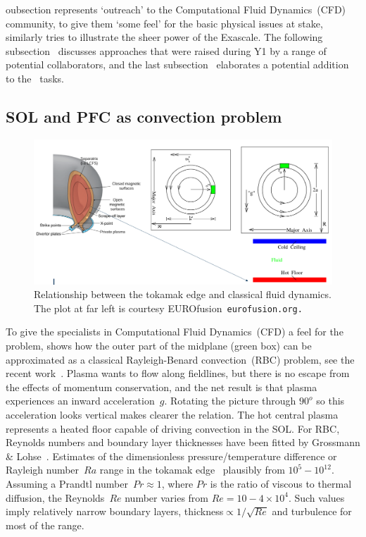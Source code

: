 oubsection  represents `outreach' to the  Computational Fluid Dynamics~(CFD) community,
to give them `some feel' for the basic physical issues at stake, similarly   tries
to illustrate the sheer power of the Exascale.  The following subsection~ discusses approaches that
were raised during Y1 by a range of potential collaborators, and the last subsection~ elaborates
a potential addition to the \nep \ tasks.

\subsection{SOL and PFC as convection problem}\label{sec:rbc}
\begin{figure}
\centerline{\includegraphics[width=13cm]{../png/rbc}}
\caption{Relationship between the tokamak edge and classical fluid dynamics\label{fig:rbc}.
The plot at far left is courtesy EUROfusion~\tt{eurofusion.org}.}
\end{figure}
To give the specialists in  Computational Fluid Dynamics~(CFD)
a feel for the problem,  shows how the outer part of
the midplane (green box) can be approximated as a classical Rayleigh-Benard convection~(RBC) problem,
see the recent work~\cite{Wi19Stab}.
Plasma wants to flow along fieldlines, but there is no escape from the effects of
momentum conservation, and the net result is that plasma experiences an inward
acceleration~$g$. Rotating the picture through $90^o$ so this acceleration looks vertical
makes clearer the relation. The hot central plasma represents a heated floor capable of
driving convection in the SOL.
For RBC, Reynolds numbers and boundary layer thicknesses have been fitted
by Grossmann \& Lohse~\cite{Gr00Scal}. Estimates of the dimensionless
pressure/temperature difference or Rayleigh number~$Ra$ range in the tokamak edge~\cite{Wi19Stab}
plausibly from $10^5-10^{12}$. Assuming a Prandtl number~$Pr\approx 1$,
where $Pr$ is the ratio of viscous to thermal diffusion,
the Reynolds~$Re$ number varies from $Re=10-4\times10^4$. Such values
imply relatively narrow boundary layers, thickness$\propto 1/\sqrt{Re}$
and turbulence for most of the range.


